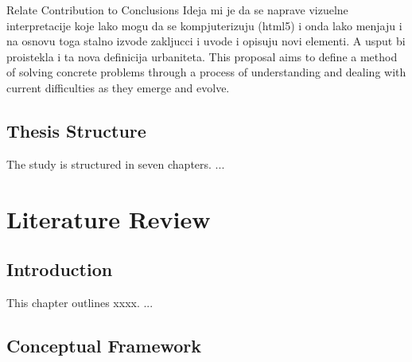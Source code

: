 \documentclass[11pt]{report}
\begin{document}
Relate Contribution to Conclusions
Ideja mi je da se naprave vizuelne interpretacije koje lako mogu da se kompjuterizuju (html5) i onda lako menjaju i na osnovu toga stalno izvode zakljucci i uvode i opisuju novi elementi.
A usput bi proistekla i ta nova definicija urbaniteta.
This proposal aims to define a method of solving concrete problems through a process of understanding and dealing with current difficulties as they emerge and evolve.

\section{Thesis Structure}

The study is structured in seven chapters. ...


\chapter{Literature Review}


\section{Introduction}

This chapter outlines xxxx. ...

\section{Conceptual Framework}
\end{document}
